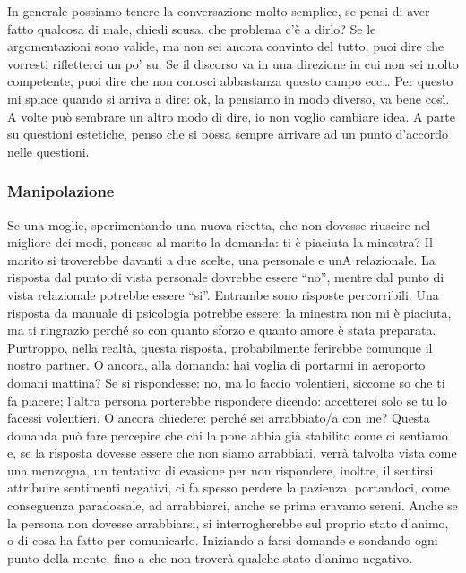 \documentclass[12pt]{book} %
\begin{document}
In generale possiamo tenere la conversazione molto semplice, se pensi di aver fatto qualcosa di male, chiedi scusa, che problema c'è a dirlo? Se le argomentazioni sono valide, ma non sei ancora convinto del tutto, puoi dire che vorresti rifletterci un po' su. Se il discorso va in una direzione in cui non sei molto competente, puoi dire che non conosci abbastanza questo campo ecc…
Per questo mi spiace quando si arriva a dire: ok, la pensiamo in modo diverso, va bene così. A volte può sembrare un altro modo di dire, io non voglio cambiare idea. A parte su questioni estetiche, penso che si possa sempre arrivare ad un punto d'accordo nelle questioni.

\subsubsection{Manipolazione}
Se una moglie, sperimentando una nuova ricetta, che non dovesse riuscire nel migliore dei modi, ponesse al marito la domanda: ti è piaciuta la minestra? Il marito si troverebbe davanti a due scelte, una personale e unA relazionale. 
La risposta dal punto di vista personale dovrebbe essere “no”, mentre dal punto di vista relazionale potrebbe essere “si”. Entrambe sono risposte percorribili. Una risposta da manuale di psicologia potrebbe essere: la minestra non mi è piaciuta, ma ti ringrazio perché so con quanto sforzo e quanto amore è stata preparata. Purtroppo, nella realtà, questa risposta, probabilmente ferirebbe comunque il nostro partner. O ancora, alla domanda: hai voglia di portarmi in aeroporto domani mattina? Se si rispondesse: no, ma lo faccio volentieri, siccome so che ti fa piacere; l'altra persona porterebbe rispondere dicendo: accetterei solo se tu lo facessi volentieri. 
O ancora chiedere: perché sei arrabbiato/a con me? Questa domanda può fare percepire che chi la pone abbia già stabilito come ci sentiamo e, se la risposta dovesse essere che non siamo arrabbiati, verrà talvolta vista come una menzogna, un tentativo di evasione per non rispondere, inoltre, il sentirsi attribuire sentimenti negativi, ci fa spesso perdere la pazienza, portandoci, come conseguenza paradossale, ad arrabbiarci, anche se prima eravamo sereni.
Anche se la persona non dovesse arrabbiarsi, si interrogherebbe sul proprio stato d'animo, o di cosa ha fatto per comunicarlo. 
Iniziando a farsi domande e sondando ogni punto della mente, fino a che non troverà qualche stato d'animo negativo. 
\end{document}

